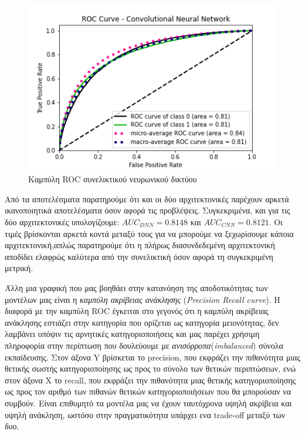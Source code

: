 \begin{figure}[H]
  \centering
  \includegraphics[width=1\textwidth]{images/CNNROC.png}
  \caption{Καμπύλη ROC συνελικτικού νευρωνικού δικτύου}
  \label{fig:CNNROC}
\end{figure}

Από τα αποτελέσματα παρατηρούμε ότι και οι δύο αρχιτεκτονικές παρέχουν αρκετά ικανοποιητικά αποτελέσματα όσον αφορά τις προβλέψεις. Συγκεκριμένα, και για τις δύο αρχιτεκτονικές υπολογίζουμε: \newline$AUC_{DNN} = 0.8148$ και $AUC_{CNN} = 0.8121$. Οι τιμές βρίσκονται αρκετά κοντά μεταξύ τους για να μπορούμε να ξεχωρίσουμε κάποια αρχιτεκτονική,απλώς παρατηρούμε ότι η πλήρως διασυνδεδεμένη αρχιτεκτονική αποδίδει ελαφρώς καλύτερα από την συνελικτική όσον αφορά τη συγκεκριμένη μετρική.

Άλλη μια γραφική που μας βοηθάει στην κατανόηση της αποδοτικότητας των μοντέλων μας είναι η \textit{καμπύλη ακρίβειας ανάκλησης} (\textit{Precision Recall curve}). Η διαφορά με την καμπύλη ROC έγκειται στο γεγονός ότι η καμπύλη ακρίβειας ανάκλησης εστιάζει στην κατηγορία που ορίζεται ως κατηγορία μειονότητας, δεν λαμβάνει υπόψιν τις αρνητικές κατηγοριοποιήσεις και μας παρέχει χρήσιμη πληροφορία στην περίπτωση που δουλεύουμε με \textit{ανισόρροπα}(\textit{imbalanced}) σύνολα εκπαίδευσης. Στον άξονα Y βρίσκεται το precision, που εκφράζει την πιθανότητα μιας θετικής σωστής κατηγοριοποίησης ως προς το σύνολο των θετικών περιπτώσεων, ενώ στον άξονα Χ το recall, που εκφράζει την πιθανότητα μιας θετικής κατηγοριοποίησης ως προς τον αριθμό των πιθανών θετικών κατηγοριοποιήσεων που θα μπορούσαν να συμβούν. Είναι επιθυμητό τα μοντέλα μας να έχουν ταυτόχρονα υψηλή ακρίβεια και υψηλή ανάκληση, ωστόσο στην πραγματικότητα υπάρχει ενα trade-off μεταξύ των δυο.

